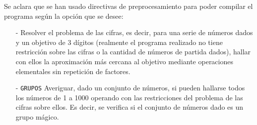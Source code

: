 \documentclass[a4paper,10pt]{scrartcl}
\def\C++#1{\texttt{#1}}
\begin{document}
   Se aclara que se han usado directivas de preprocesamiento para poder compilar el programa según la opción que se desee:
   \begin{itemize}
    \item [-] Resolver el problema de las cifras, es decir, para una serie de números dados y un objetivo de 3 dígitos
    (realmente el programa realizado no tiene restricción sobre las cifras o la cantidad de números de partida dados), hallar
    con ellos la aproximación más cercana al objetivo mediante operaciones elementales sin repetición de factores.
    \item [-] \C++{GRUPOS} Averiguar, dado un conjunto de números, si pueden hallarse todos los números de 1 a 1000 operando
    con las restricciones del problema de las cifras sobre ellos. Es decir, se verifica si el conjunto de números dado
    es un grupo mágico.
   \end{itemize}

   
   
\end{document}
